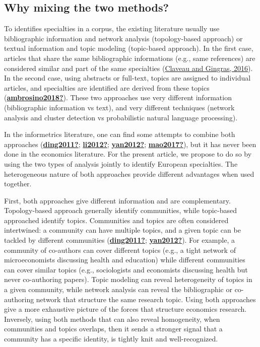 \documentclass[]{elsarticle} %
\begin{document}
\hypertarget{why-mixing-the-two-methods}{%
\subsection{Why mixing the two
methods?}\label{why-mixing-the-two-methods}}

To identifies specialties in a corpus, the existing literature usually
use bibliographic information and network analysis (topology-based
approach) or textual information and topic modeling (topic-based
approach). In the first case, articles that share the same bibliographic
informations (e.g., same references) are considered similar and part of
the same specialties (\protect\hyperlink{ref-claveau2016}{Claveau and
Gingras, 2016}). In the second case, using abstracts or full-text,
topics are assigned to individual articles, and specialties are
identified are derived from these topics
(\protect\hyperlink{ref-ambrosino2018}{\textbf{ambrosino2018?}}). These
two approaches use very different information (bibliographic information
vs text), and very different techniques (network analysis and cluster
detection vs probabilistic natural language processing).

In the informetrics literature, one can find some attempts to combine
both approaches (\protect\hyperlink{ref-ding2011}{\textbf{ding2011?}};
\protect\hyperlink{ref-li2012}{\textbf{li2012?}};
\protect\hyperlink{ref-yan2012}{\textbf{yan2012?}};
\protect\hyperlink{ref-mao2017}{\textbf{mao2017?}}), but it has never
been done in the economics literature. For the present article, we
propose to do so by using the two types of analysis jointly to identify
European specialties. The heterogeneous nature of both approaches
provide different advantages when used together.

First, both approaches give different information and are complementary.
Topology-based approach generally identify communities, while
topic-based approached identify topics. Communities and topics are often
considered intertwined: a community can have multiple topics, and a
given topic can be tackled by different communities
(\protect\hyperlink{ref-ding2011}{\textbf{ding2011?}};
\protect\hyperlink{ref-yan2012}{\textbf{yan2012?}}). For example, a
community of co-authors can cover different topics (e.g., a tight
network of microeconomists discussing health and education) while
different communities can cover similar topics (e.g., sociologists and
economists discussing health but never co-authoring papers). Topic
modeling can reveal heterogeneity of topics in a given community, while
network analysis can reveal the bibliographic or co-authoring network
that structure the same research topic. Using both approaches give a
more exhaustive picture of the forces that structure economics research.
Inversely, using both methods that can also reveal homogeneity, when
communities and topics overlaps, then it sends a stronger signal that a
community has a specific identity, is tightly knit and well-recognized.
\end{document}
